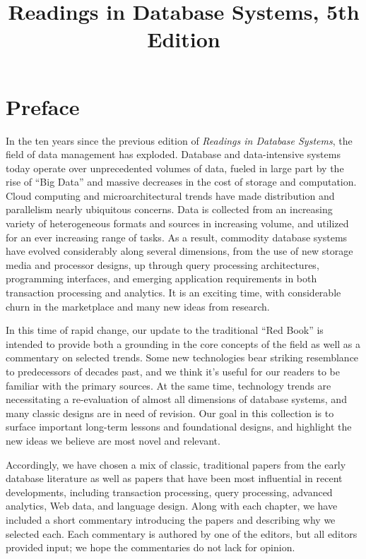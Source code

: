 \documentclass[b5paper,11pt,twoside,openright]{book}
\title{Readings in Database Systems, 5th Edition}
\author{}
\date{}
\begin{document}
\maketitle
\thispagestyle{empty}

\cleardoublepage
{}
\tableofcontents

\hypertarget{preface}{\chapter*{Preface}}

In the ten years since the previous edition of \emph{Readings in
Database Systems}, the field of data management has exploded. Database
and data-intensive systems today operate over unprecedented volumes of
data, fueled in large part by the rise of ``Big Data'' and massive
decreases in the cost of storage and computation. Cloud computing and
microarchitectural trends have made distribution and parallelism nearly
ubiquitous concerns. Data is collected from an increasing variety of
heterogeneous formats and sources in increasing volume, and utilized for
an ever increasing range of tasks. As a result, commodity database
systems have evolved considerably along several dimensions, from the use
of new storage media and processor designs, up through query processing
architectures, programming interfaces, and emerging application
requirements in both transaction processing and analytics. It is an
exciting time, with considerable churn in the marketplace and many new
ideas from research.

In this time of rapid change, our update to the traditional ``Red Book''
is intended to provide both a grounding in the core concepts of the
field as well as a commentary on selected trends. Some new technologies
bear striking resemblance to predecessors of decades past, and we think
it's useful for our readers to be familiar with the primary sources. At
the same time, technology trends are necessitating a re-evaluation of
almost all dimensions of database systems, and many classic designs are
in need of revision. Our goal in this collection is to surface important
long-term lessons and foundational designs, and highlight the new ideas
we believe are most novel and relevant.

Accordingly, we have chosen a mix of classic, traditional papers from
the early database literature as well as papers that have been most
influential in recent developments, including transaction processing,
query processing, advanced analytics, Web data, and language design.
Along with each chapter, we have included a short commentary introducing
the papers and describing why we selected each. Each commentary is
authored by one of the editors, but all editors provided input; we hope
the commentaries do not lack for opinion.
\end{document}
